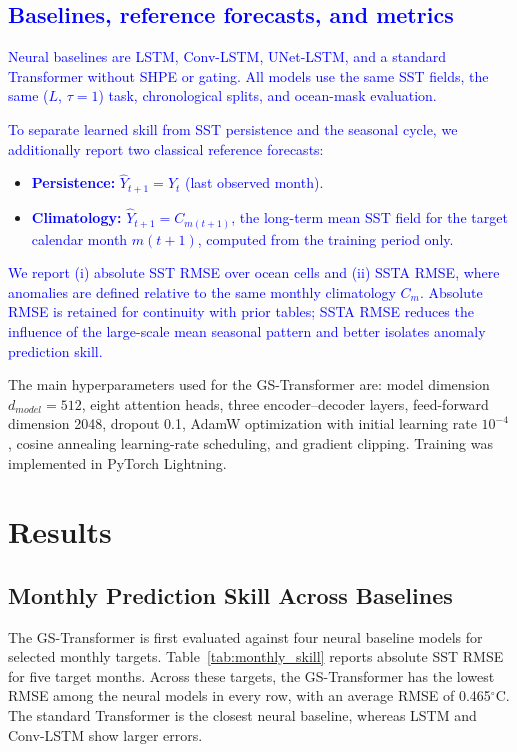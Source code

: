\documentclass[published]{agujournal2025}
\newcommand{\rev}[1]{\textcolor{blue}{#1}}
\begin{document}
\subsection{\rev{Baselines, reference forecasts, and metrics}}
\rev{Neural baselines are LSTM, Conv-LSTM, UNet-LSTM, and a standard Transformer without SHPE or gating. All models use the same SST fields, the same ($L$, $\tau=1$) task, chronological splits, and ocean-mask evaluation.}

\rev{To separate learned skill from SST persistence and the seasonal cycle, we additionally report two classical reference forecasts:}
\begin{itemize}
    \item \rev{\textbf{Persistence:} $\hat{Y}_{t+1}=Y_t$ (last observed month).}
    \item \rev{\textbf{Climatology:} $\hat{Y}_{t+1}=C_{m(t+1)}$, the long-term mean SST field for the target calendar month $m(t+1)$, computed from the training period only.}
\end{itemize}

\rev{We report (i) absolute SST RMSE over ocean cells and (ii) SSTA RMSE, where anomalies are defined relative to the same monthly climatology $C_m$. Absolute RMSE is retained for continuity with prior tables; SSTA RMSE reduces the influence of the large-scale mean seasonal pattern and better isolates anomaly prediction skill.}

The main hyperparameters used for the GS-Transformer are: model dimension $d_{model}=512$, eight attention heads, three encoder--decoder layers, feed-forward dimension 2048, dropout 0.1, AdamW optimization with initial learning rate $10^{-4}$, cosine annealing learning-rate scheduling, and gradient clipping. Training was implemented in PyTorch Lightning\cite{paszke2019pytorch}.

\section{Results}

\subsection{Monthly Prediction Skill Across Baselines}
The GS-Transformer is first evaluated against four neural baseline models for selected monthly targets. Table~\ref{tab:monthly_skill} reports absolute SST RMSE for five target months. Across these targets, the GS-Transformer has the lowest RMSE among the neural models in every row, with an average RMSE of 0.465$^\circ$C. The standard Transformer is the closest neural baseline, whereas LSTM and Conv-LSTM show larger errors.
\end{document}
